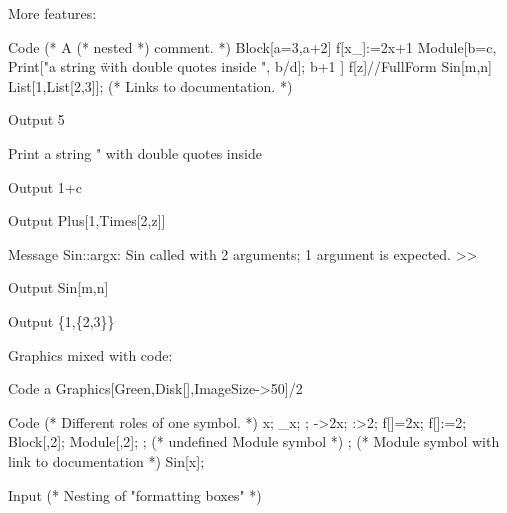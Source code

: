 \documentclass{article}
\begin{document}
More features:
\begin{mmaCell}[
  moredefined=f,
  functionlocal=a,
  local=b,
  pattern={x_,x},
  excessargument=n,
  linkbuiltin=List
]{Code}
  (* A (* nested *) comment. *)
  Block[{a=3},a+2]
  f[x_]:=2x+1 
  Module[{b=c},
      Print["a string \" with double quotes inside ", b/d];
      b+1
  ]
  f[z]//FullForm
  Sin[m,n]
  List[1,List[2,3]]; (* Links to documentation. *)
\end{mmaCell}
\begin{mmaCell}{Output}
  5
\end{mmaCell}
\begin{mmaCell}{Print}
  a string " with double quotes inside 
\end{mmaCell}
\begin{mmaCell}[addtoindex=1]{Output}
  1+c
\end{mmaCell}
\begin{mmaCell}[form=FullForm]{Output}
  Plus[1,Times[2,z]]
\end{mmaCell}
\begin{mmaCell}[messagelink={message/General/argx}]{Message}
  Sin::argx: Sin called with 2 arguments; 1 argument is expected. >>
\end{mmaCell}
\begin{mmaCell}{Output}
  Sin[m,n]
\end{mmaCell}
\begin{mmaCell}{Output}
  \{1,\{2,3\}\}
\end{mmaCell}
Graphics mixed with code:
\begin{mmaCell}{Code}
  a Graphics[{Green,Disk[]},ImageSize->50]/2
\end{mmaCell}
\begin{mmaCell}{Code}
  (* Different roles of one symbol. *)
  x;
  _x;
  ;
  ->2x;
  :>2;
  f[]=2x;
  f[]:=2;
  Block[{},2];
  Module[{},2];
  ; (* undefined Module symbol *)
  ; (* Module symbol with link to documentation *)
  Sin[x];
\end{mmaCell}
\begin{mmaCell}[addtoindex=11]{Input}
  (* Nesting of "formatting boxes" *)
          
\end{mmaCell}
\end{document}
